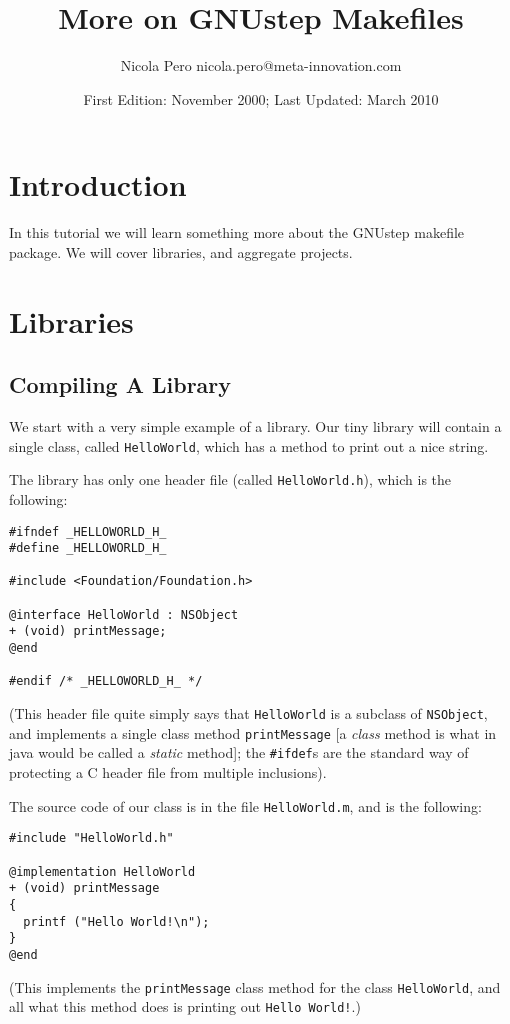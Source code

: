 \documentclass[a4paper]{article}
\begin{document}
\author{Nicola Pero nicola.pero@meta-innovation.com}
\title{More on GNUstep Makefiles}
\date{First Edition: November 2000; Last Updated: March 2010}
\maketitle

\section{Introduction}
In this tutorial we will learn something more about the GNUstep
makefile package.  We will cover libraries, and aggregate projects.

\section{Libraries}

\subsection{Compiling A Library}
We start with a very simple example of a library.  Our tiny 
library will contain a single class, called \texttt{HelloWorld}, 
which has a method to print out a nice string.

The library has only one header file (called \texttt{HelloWorld.h}),
which is the following:
\begin{verbatim}
#ifndef _HELLOWORLD_H_
#define _HELLOWORLD_H_

#include <Foundation/Foundation.h>

@interface HelloWorld : NSObject
+ (void) printMessage;
@end

#endif /* _HELLOWORLD_H_ */
\end{verbatim}
(This header file quite simply says that \texttt{HelloWorld} is a
subclass of \texttt{NSObject}, and implements a single class method
\texttt{printMessage} [a {\sl class} method is what in java would be
called a {\sl static} method]; the \texttt{\#ifdef}s are the
standard way of protecting a C header file from multiple inclusions).

The source code of our class is in the file \texttt{HelloWorld.m}, and
is the following:
\begin{verbatim}
#include "HelloWorld.h"

@implementation HelloWorld
+ (void) printMessage 
{
  printf ("Hello World!\n");
} 
@end
\end{verbatim}
(This implements the \texttt{printMessage} class method for the class
\texttt{HelloWorld}, and all what this method does is printing out
\texttt{Hello World!}.)
\end{document}
